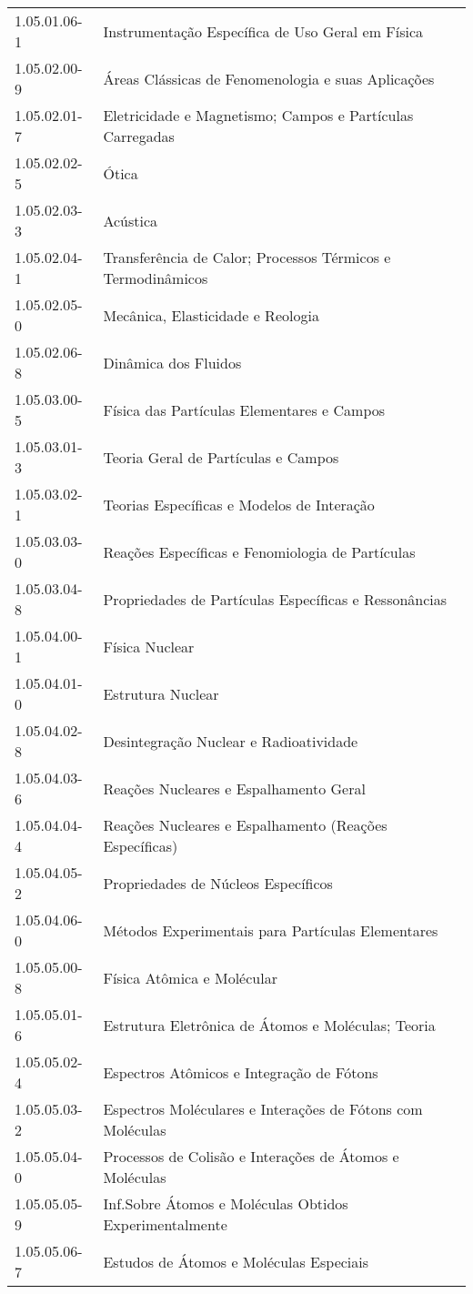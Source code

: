 \begin{longtable}[c]{p{2.15cm}p{13cm}}
1.05.01.06-1 & Instrumentação Específica de Uso Geral em Física \\
1.05.02.00-9 & Áreas Clássicas de Fenomenologia e suas Aplicações \\
1.05.02.01-7 & Eletricidade e Magnetismo; Campos e Partículas Carregadas \\
1.05.02.02-5 & Ótica \\
1.05.02.03-3 & Acústica \\
1.05.02.04-1 & Transferência de Calor; Processos Térmicos e Termodinâmicos \\
1.05.02.05-0 & Mecânica, Elasticidade e Reologia \\
1.05.02.06-8 & Dinâmica dos Fluidos \\
1.05.03.00-5 & Física das Partículas Elementares e Campos \\
1.05.03.01-3 & Teoria Geral de Partículas e Campos \\
1.05.03.02-1 & Teorias Específicas e Modelos de Interação \\
1.05.03.03-0 & Reações Específicas e Fenomiologia de Partículas \\
1.05.03.04-8 & Propriedades de Partículas Específicas e Ressonâncias \\
1.05.04.00-1 & Física Nuclear \\
1.05.04.01-0 & Estrutura Nuclear \\
1.05.04.02-8 & Desintegração Nuclear e Radioatividade \\
1.05.04.03-6 & Reações Nucleares e Espalhamento Geral \\
1.05.04.04-4 & Reações Nucleares e Espalhamento (Reações Específicas) \\
1.05.04.05-2 & Propriedades de Núcleos Específicos \\
1.05.04.06-0 & Métodos Experimentais para Partículas Elementares \\
1.05.05.00-8 & Física Atômica e Molécular \\
1.05.05.01-6 & Estrutura Eletrônica de Átomos e Moléculas; Teoria \\
1.05.05.02-4 & Espectros Atômicos e Integração de Fótons \\
1.05.05.03-2 & Espectros Moléculares e Interações de Fótons com Moléculas \\
1.05.05.04-0 & Processos de Colisão e Interações de Átomos e Moléculas \\
1.05.05.05-9 & Inf.Sobre Átomos e Moléculas Obtidos Experimentalmente \\
1.05.05.06-7 & Estudos de Átomos e Moléculas Especiais \\

\end{longtable}
